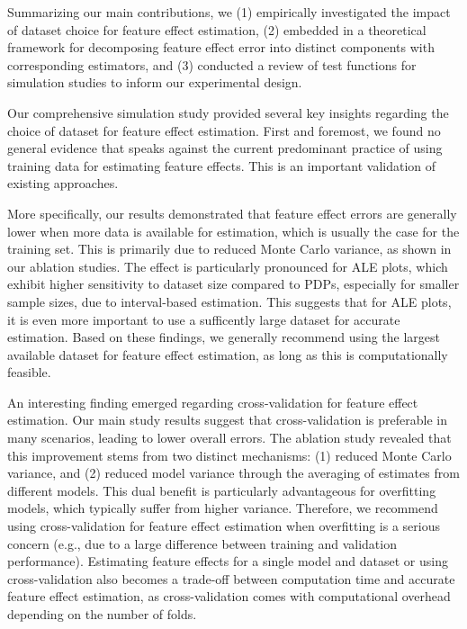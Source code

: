 \documentclass[runningheads]{llncs}
\begin{document}
Summarizing our main contributions, we (1) empirically investigated the impact of
dataset choice for feature effect estimation, (2) embedded in a theoretical framework
for decomposing feature effect error into distinct components with corresponding estimators,
and (3) conducted a review of test functions for simulation studies to inform our experimental design.

Our comprehensive simulation study provided several key insights regarding 
the choice of dataset for feature effect estimation. First and foremost,
we found no general evidence that speaks against the current predominant practice
of using training data for estimating feature effects. This is an important validation
of existing approaches.

More specifically, our results demonstrated that feature effect errors are
generally lower when more data is available for estimation, which is usually
the case for the training set. This is primarily due to reduced Monte Carlo variance,
as shown in our ablation studies. The effect is particularly pronounced for ALE plots,
which exhibit higher sensitivity to dataset size compared to PDPs, especially for smaller sample
sizes, due to interval-based estimation. This suggests that for ALE plots, it is even more
important to use a sufficently large dataset for accurate estimation. Based on these
findings, we generally recommend using the largest available dataset for feature effect
estimation, as long as this is computationally feasible.

An interesting finding emerged regarding cross-validation for feature effect estimation.
Our main study results suggest that cross-validation is preferable in many scenarios,
leading to lower overall errors. The ablation study revealed that this improvement stems from two distinct mechanisms:
(1) reduced Monte Carlo variance, and (2) reduced model variance through the averaging of estimates from different models.
This dual benefit is particularly advantageous for overfitting models, which typically suffer
from higher variance. Therefore, we recommend using cross-validation for feature effect estimation
when overfitting is a serious concern (e.g., due to a large difference between training
and validation performance). Estimating feature effects for a single model and dataset
or using cross-validation also becomes a trade-off between computation time and accurate
feature effect estimation, as cross-validation comes with computational overhead depending
on the number of folds.
\end{document}
